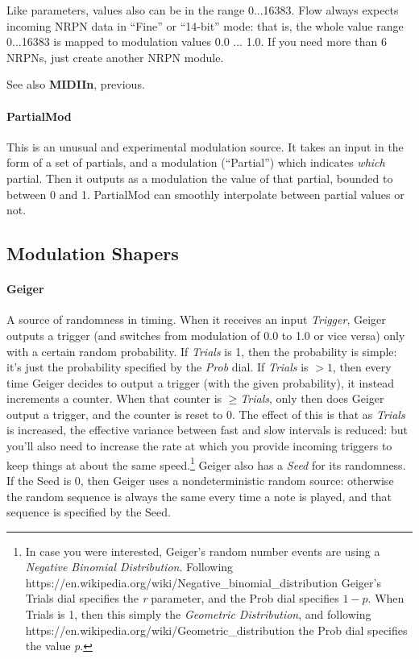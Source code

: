 \documentclass{article}
\newcommand\name{Flow}
\begin{document}
Like parameters, values also can be in the range 0...16383.  {\name} always expects incoming NRPN data in ``Fine'' or ``14-bit'' mode: that is, the whole value range 0...16383 is mapped to modulation values 0.0 ... 1.0.  If you need more than 6 NRPNs, just create another NRPN module.  

See also {\bf MIDIIn}, previous.

\paragraph{PartialMod}  This is an unusual and experimental modulation source.  It takes an input in the form of a set of partials, and a modulation (``Partial'') which indicates {\it which} partial.  Then it outputs as a modulation the value of that partial, bounded to between 0 and 1.  PartialMod can smoothly interpolate between partial values or not.




\subsection{Modulation Shapers}

\paragraph{Geiger}  A source of randomness in timing.  When it receives an input {\it Trigger}, Geiger outputs a trigger (and switches from modulation of 0.0 to 1.0 or vice versa) only with a certain random probability.  If {\it Trials} is 1, then the probability is simple: it's just the probability specified by the {\it Prob} dial.  If {\it Trials} is \(>1\), then every time Geiger decides to output a trigger (with the given probability), it instead increments a counter.  When that counter is  \(\geq\){\it Trials}, only then does Geiger output a trigger, and the counter is reset to 0.  The effect of this is that as {\it Trials} is increased, the effective variance between fast and slow intervals is reduced: but you'll also need to increase the rate at which you provide incoming triggers to keep things at about the same speed.\footnote{In case you were interested, Geiger's random number events are using a {\it Negative Binomial Distribution}.  Following https:/\!/en.wikipedia.org/wiki/Negative\_binomial\_distribution Geiger's Trials dial specifies the {\it r} parameter, and the Prob dial specifies \(1-p\).  When Trials is 1, then this simply the {\it Geometric Distribution}, and following https:/\!/en.wikipedia.org/wiki/Geometric\_distribution the Prob dial specifies the value {\it p}.}  Geiger also has a {\it Seed} for its randomness.  If the Seed is 0, then Geiger uses a nondeterministic random source: otherwise the random sequence is always the same every time a note is played, and that sequence is specified by the Seed.
\end{document}
